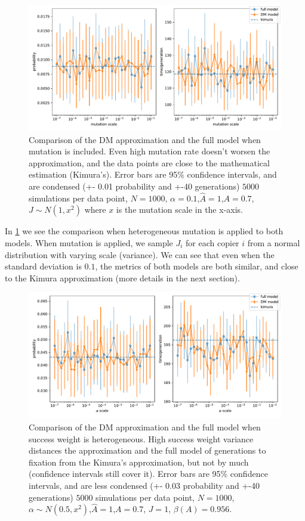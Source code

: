 \documentclass[12pt]{extarticle}
\begin{document}
\begin{figure}
    \includegraphics[width=\linewidth]{../figures/binary/full_vs_dm_mutation.pdf}
  \caption{Comparison of the DM approximation and the full model when mutation is included. Even high mutation rate doesn't worsen the approximation, and the data points are close to the mathematical estimation (Kimura's). Error bars are 95\% confidence intervals, and are condensed (+- 0.01 probability and +-40 generations)
  $5000$ simulations per data point, $N=1000$, $\alpha=0.1$,$\hat{A}=1$,$A=0.7$, $J\sim N(1,x^2)$ where $x$ is the mutation scale in the x-axis.
  }	
  \label{fig:hetro_mutation}
\end{figure}


In \cref{fig:hetro_mutation} we see the comparison when heterogeneous mutation is applied to both models. When mutation is applied, we sample $J_i$ for each copier $i$ from a normal distribution with varying scale (variance).
We can see that even when the standard deviation is $0.1$, the metrics of both models are both similar, and close to the Kimura approximation (more details in the next section). 

\begin{figure}
    \includegraphics[width=\linewidth]{../figures/binary/full_vs_dm_changing_alpha.pdf}
  \caption{Comparison of the DM approximation and the full model when success weight is heterogeneous. High success weight variance distances the approximation and the full model of generations to fixation from the Kimura's approximation, but not by much (confidence intervals still cover it). Error bars are 95\% confidence intervals, and are less condensed (+- 0.03 probability and +-40 generations)
  $5000$ simulations per data point, $N=1000$, $\alpha\sim N(0.5,x^2)$,$\hat{A}=1$,$A=0.7$, $J=1$, $\beta(A)=0.956$.}	
  \label{fig:hetro_alpha}
\end{figure}
\end{document}
